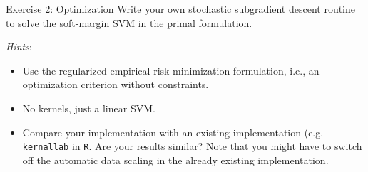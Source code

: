 \documentclass[aspectratio=169]{beamer}
\begin{document}
%	


%

\begin{frame}{Exercise 2: Optimization}
	Write your own stochastic subgradient descent routine to solve the soft-margin SVM in the primal formulation.
	
	\emph{Hints}:
	\begin{itemize}
		\item Use the regularized-empirical-risk-minimization formulation, i.e., an optimization criterion without constraints.
		\item No kernels, just a linear SVM.
		\item Compare your implementation with an existing implementation (e.g. \texttt{kernallab} in \texttt{R}. Are your results similar? Note that you might have to switch off the automatic data scaling in the already existing implementation.
	\end{itemize}
	
\end{frame}
\end{document}

